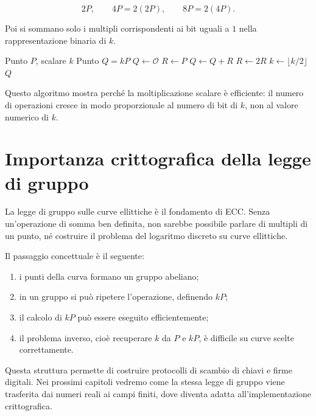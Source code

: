 \documentclass[12pt,a4paper,oneside]{report}
\begin{document}
\[
2P,\qquad 4P=2(2P),\qquad 8P=2(4P).
\]

Poi si sommano solo i multipli corrispondenti ai bit uguali a \(1\) nella rappresentazione binaria di \(k\).

\begin{algorithm}[h]
\caption{Moltiplicazione scalare double-and-add}
\begin{algorithmic}[1]
\REQUIRE Punto \(P\), scalare \(k\)
\ENSURE Punto \(Q=kP\)
\STATE \(Q \leftarrow \mathcal{O}\)
\STATE \(R \leftarrow P\)
        \STATE \(Q \leftarrow Q+R\)
    \ENDIF
    \STATE \(R \leftarrow 2R\)
    \STATE \(k \leftarrow \lfloor k/2 \rfloor\)
\ENDWHILE
\RETURN \(Q\)
\end{algorithmic}
\end{algorithm}

Questo algoritmo mostra perché la moltiplicazione scalare è efficiente: il numero di operazioni cresce in modo proporzionale al numero di bit di \(k\), non al valore numerico di \(k\).

\section{Importanza crittografica della legge di gruppo}

La legge di gruppo sulle curve ellittiche è il fondamento di ECC. Senza un'operazione di somma ben definita, non sarebbe possibile parlare di multipli di un punto, né costruire il problema del logaritmo discreto su curve ellittiche.

Il passaggio concettuale è il seguente:

\begin{enumerate}
    \item i punti della curva formano un gruppo abeliano;
    \item in un gruppo si può ripetere l'operazione, definendo \(kP\);
    \item il calcolo di \(kP\) può essere eseguito efficientemente;
    \item il problema inverso, cioè recuperare \(k\) da \(P\) e \(kP\), è difficile su curve scelte correttamente.
\end{enumerate}

Questa struttura permette di costruire protocolli di scambio di chiavi e firme digitali. Nei prossimi capitoli vedremo come la stessa legge di gruppo viene trasferita dai numeri reali ai campi finiti, dove diventa adatta all'implementazione crittografica.
\end{document}
